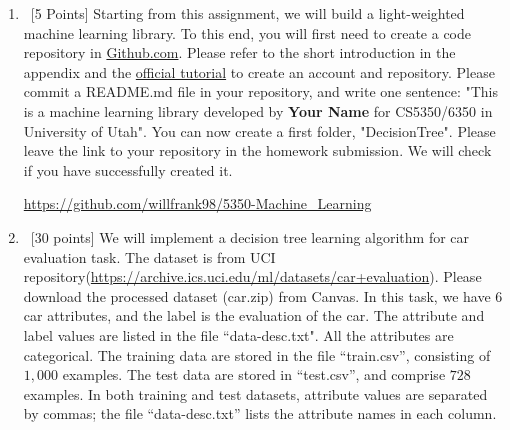 \documentclass[12pt, fullpage,letterpaper]{article}
\begin{document}
\begin{enumerate}
	\item~[5 Points] Starting from this assignment, we will build a light-weighted machine learning library. 
To this end, you will first need to create a code repository in \href{https://github.com/}{Github.com}. Please refer to the short introduction in the appendix and the \href{https://guides.github.com/activities/hello-world/}{official tutorial} to create an account and repository. Please commit a README.md file in your repository, and write one sentence: "This is a machine learning library developed by \textbf{Your Name} for CS5350/6350 in University of Utah".  You can now create a first folder, "DecisionTree". Please leave the link to your repository in the homework submission. We will check if you have successfully created it. 

\url{https://github.com/willfrank98/5350-Machine_Learning}

\item~[30 points] We will implement a decision tree learning algorithm for car evaluation task. The dataset is from UCI repository(\url{https://archive.ics.uci.edu/ml/datasets/car+evaluation}). Please download the processed dataset (car.zip) from Canvas.  In this task, we have $6$ car attributes, and the label is the evaluation of the car. The attribute and label values are listed in the file ``data-desc.txt". All the attributes are categorical. The training data are stored in the file ``train.csv'', consisting of $1,000$ examples. The test data are stored in ``test.csv'', and comprise $728$ examples. In both training and test datasets, attribute values are separated by commas; the file ``data-desc.txt''  lists the attribute names in each column. 
\\


\end{enumerate}
\end{document}
